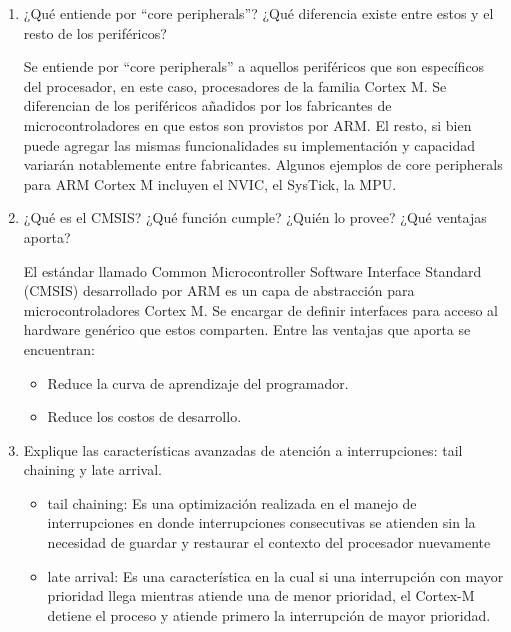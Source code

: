 \documentclass[12pt, a4paper]{article}
\makeatletter
\newcommand\setItemnumber[1]{\setcounter{enum\romannumeral\@enumdepth}{\numexpr#1-1\relax}}
\makeatother
\begin{document}
\begin{enumerate}
    \setItemnumber{12}
    \item ¿Qué entiende por ``core peripherals''? ¿Qué diferencia existe entre estos y 
    el resto de los periféricos?
    
    Se entiende por ``core peripherals'' a aquellos periféricos que son específicos del 
    procesador, en este caso, procesadores de la familia Cortex M. Se diferencian de los 
    periféricos añadidos por los fabricantes de microcontroladores en que estos son provistos 
    por ARM. El resto, si bien puede agregar las mismas funcionalidades su implementación y capacidad
    variarán notablemente entre fabricantes. Algunos ejemplos de core peripherals para ARM Cortex M 
    incluyen el NVIC, el SysTick, la MPU.
    
    \setItemnumber{14}
    \item ¿Qué es el CMSIS? ¿Qué función cumple? ¿Quién lo provee? ¿Qué ventajas aporta?
    
    El estándar llamado Common Microcontroller Software Interface Standard (CMSIS) desarrollado por 
    ARM es un capa de abstracción para microcontroladores Cortex M. Se encargar de definir interfaces
    para acceso al hardware genérico que estos comparten. Entre las ventajas que aporta se encuentran:
    
    \begin{itemize}
        \item Reduce la curva de aprendizaje del programador.
        \item Reduce los costos de desarrollo.
    \end{itemize}
    
    \setItemnumber{16}
    \item Explique las características avanzadas de atención a interrupciones: tail chaining y late
    arrival.
    
    \begin{itemize}
        \item tail chaining: Es una optimización realizada en el manejo de interrupciones en donde 
        interrupciones consecutivas se atienden sin la necesidad de guardar y restaurar el contexto del 
        procesador nuevamente  
        
        \item late arrival: Es una característica en la cual si una interrupción con mayor prioridad llega 
        mientras atiende una de menor prioridad, el Cortex-M detiene el proceso y atiende primero la 
        interrupción de mayor prioridad.
    \end{itemize}
    

\end{enumerate}
\end{document}
